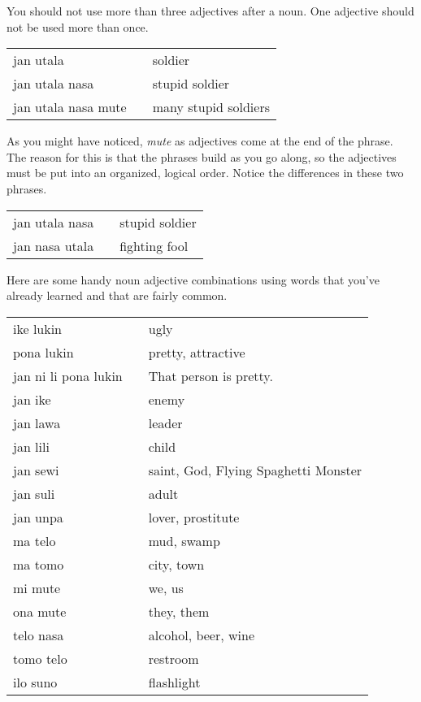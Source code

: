 You should not use more than three adjectives after a noun.
One adjective should not be used more than once.

\begin{supertabular}{p{5,5cm}|ll}
    jan utala           &  & soldier              \\
    jan utala nasa      &  & stupid soldier       \\
    jan utala nasa mute &  & many stupid soldiers \\
\end{supertabular}

As you might have noticed, \textit{mute} as adjectives come at the end of the phrase.
The reason for this is that the phrases build as you go along, so the adjectives must be put into an organized, logical order.
Notice the differences in these two phrases.

\begin{supertabular}{p{5,5cm}|ll}
    jan utala nasa &  & stupid soldier \\
    jan nasa utala &  & fighting fool  \\
\end{supertabular}

Here are some handy noun adjective combinations using words that you've already learned and that are fairly common.

\begin{supertabular}{p{5,5cm}|ll}
    ike lukin            &  & ugly                                 \\
    pona lukin           &  & pretty, attractive                   \\
    jan ni li pona lukin &  & That person is pretty.               \\
    jan ike              &  & enemy                                \\
    jan lawa             &  & leader                               \\
    jan lili             &  & child                                \\
    jan sewi             &  & saint, God, Flying Spaghetti Monster \\
    jan suli             &  & adult                                \\
    jan unpa             &  & lover, prostitute                    \\
    ma telo              &  & mud, swamp                           \\
    ma tomo              &  & city, town                           \\
    mi mute              &  & we, us                               \\
    ona mute             &  & they, them                           \\
    telo nasa            &  & alcohol, beer, wine                  \\
    tomo telo            &  & restroom                             \\
    ilo suno             &  & flashlight                           \\
\end{supertabular}

